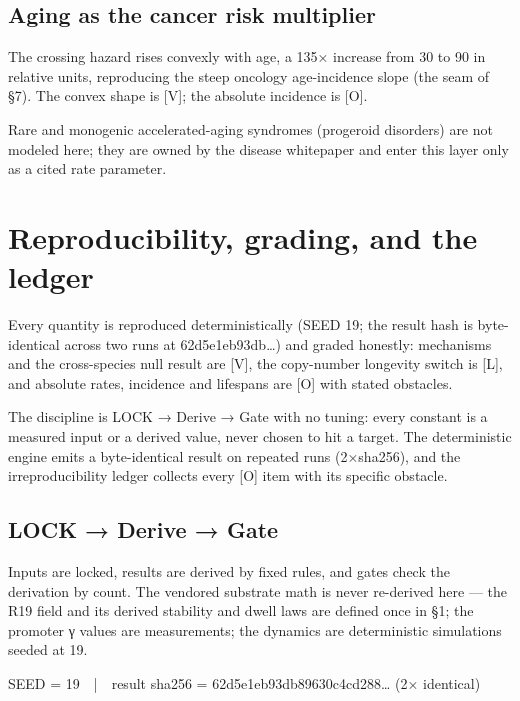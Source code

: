 \documentclass[11pt]{article}
\begin{document}
\subsection*{Aging as the cancer risk multiplier}

The crossing hazard rises convexly with age, a 135× increase from 30 to 90 in relative units, reproducing the steep oncology age-incidence slope (the seam of §7). The convex shape is [V]; the absolute incidence is [O].

Rare and monogenic accelerated-aging syndromes (progeroid disorders) are not modeled here; they are owned by the disease whitepaper and enter this layer only as a cited rate parameter.

\section{Reproducibility, grading, and the ledger}

\begin{answerbox}Every quantity is reproduced deterministically (SEED 19; the result hash is byte-identical across two runs at 62d5e1eb93db…) and graded honestly: mechanisms and the cross-species null result are [V], the copy-number longevity switch is [L], and absolute rates, incidence and lifespans are [O] with stated obstacles.\end{answerbox}

\begin{abstractbox}The discipline is LOCK → Derive → Gate with no tuning: every constant is a measured input or a derived value, never chosen to hit a target. The deterministic engine emits a byte-identical result on repeated runs (2×sha256), and the irreproducibility ledger collects every [O] item with its specific obstacle.\end{abstractbox}

\subsection*{LOCK → Derive → Gate}

Inputs are locked, results are derived by fixed rules, and gates check the derivation by count. The vendored substrate math is never re-derived here — the R19 field and its derived stability and dwell laws are defined once in §1; the promoter γ values are measurements; the dynamics are deterministic simulations seeded at 19.

\begin{center}\ttfamily\small SEED = 19  |  result sha256 = 62d5e1eb93db89630c4cd288… (2× identical)\end{center}
\end{document}
